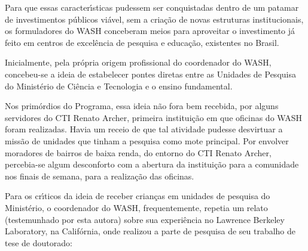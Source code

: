 \documentclass[
12pt,		%
openright,	%
twoside,  %
a4paper,			%
chapter=TITLE,		%
english,			%
french,				%
spanish,			%
brazil				%
]{USPSC-classe/USPSC}
\begin{document}
Para que essas caracter\'{\i}sticas pudessem ser conquistadas dentro de um patamar de investimentos p\'ublicos vi\'avel, sem a cria\c{c}\~ao de novas estruturas institucionais, os formuladores do WASH conceberam meios para aproveitar o investimento j\'a feito em centros de excel\^encia de pesquisa e educa\c{c}\~ao, existentes no Brasil.

















Inicialmente, pela pr\'opria origem profissional do coordenador do WASH, concebeu-se a ideia de estabelecer pontes diretas entre as Unidades de Pesquisa do Minist\'erio de Ci\^encia e Tecnologia e o ensino fundamental.

















Nos prim\'ordios do Programa, essa ideia n\~ao fora bem recebida, por alguns servidores do CTI Renato Archer, primeira institui\c{c}\~ao em que oficinas do WASH foram realizadas. Havia um receio de que tal atividade pudesse \textquotedbl  desvirtuar \textquotedbl  a miss\~ao de unidades que tinham a pesquisa como mote principal. Por envolver moradores de bairros de baixa renda, do entorno do CTI Renato Archer, percebia-se algum desconforto com a abertura da institui\c{c}\~ao para a comunidade nos finais de semana, para a realiza\c{c}\~ao das oficinas.

















Para os cr\'{\i}ticos da ideia de receber crian\c{c}as em unidades de pesquisa do Minist\'erio, o coordenador do WASH, frequentemente, repetia um relato (testemunhado por esta autora) sobre sua experi\^encia no Lawrence Berkeley Laboratory, na Calif\'ornia, onde realizou a parte de pesquisa de seu trabalho de tese de doutorado:
\end{document}
